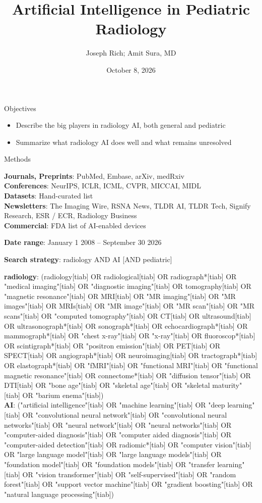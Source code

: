 \documentclass[aspectratio=169]{beamer}
\title[Radiology AI]{Artificial Intelligence in Pediatric Radiology}
\author{Joseph Rich; Amit Sura, MD}
\institute{CHLA Radiology Grand Rounds}
\date{October 8, 2026}
\begin{document}
\frame{\titlepage}

\begin{frame}{Objectives}
\begin{itemize}
  \item Describe the big players in radiology AI, both general and pediatric
  \item Summarize what radiology AI does well and what remains unresolved
\end{itemize}
\end{frame}

\begin{frame}{Methods}
\vspace{-4pt}
{\small
\textbf{Journals, Preprints}: PubMed, Embase, arXiv, medRxiv\\
\textbf{Conferences}: NeurIPS, ICLR, ICML, CVPR, MICCAI, MIDL\\
\textbf{Datasets}: Hand-curated list\\
\textbf{Newsletters}: The Imaging Wire, RSNA News, TLDR AI, TLDR Tech, Signify Research, ESR / ECR, Radiology Business\\
\textbf{Commercial}: FDA list of AI-enabled devices\par}
\vspace{2pt}
{\small\textbf{Date range}: January 1 2008 -- September 30 2026\par}
{\small\textbf{Search strategy}: radiology AND AI [AND pediatric]\par}
\vspace{2pt}
{\tiny\fontsize{6}{7.3}\selectfont\raggedright
\textbf{radiology}: (radiology[tiab] OR radiological[tiab] OR radiograph*[tiab] OR "medical imaging"[tiab] OR "diagnostic imaging"[tiab] OR tomography[tiab] OR "magnetic resonance"[tiab] OR MRI[tiab] OR "MR imaging"[tiab] OR "MR images"[tiab] OR MRIs[tiab] OR "MR image"[tiab] OR "MR scan"[tiab] OR "MR scans"[tiab] OR "computed tomography"[tiab] OR CT[tiab] OR ultrasound[tiab] OR ultrasonograph*[tiab] OR sonograph*[tiab] OR echocardiograph*[tiab] OR mammograph*[tiab] OR "chest x-ray"[tiab] OR "x-ray"[tiab] OR fluoroscop*[tiab] OR scintigraph*[tiab] OR "positron emission"[tiab] OR PET[tiab] OR SPECT[tiab] OR angiograph*[tiab] OR neuroimaging[tiab] OR tractograph*[tiab] OR elastograph*[tiab] OR "fMRI"[tiab] OR "functional MRI"[tiab] OR "functional magnetic resonance"[tiab] OR connectome*[tiab] OR "diffusion tensor"[tiab] OR DTI[tiab] OR "bone age"[tiab] OR "skeletal age"[tiab] OR "skeletal maturity"[tiab] OR "barium enema"[tiab])\\[2pt]
\textbf{AI}: ("artificial intelligence"[tiab] OR "machine learning"[tiab] OR "deep learning"[tiab] OR "convolutional neural network"[tiab] OR "convolutional neural networks"[tiab] OR "neural network"[tiab] OR "neural networks"[tiab] OR "computer-aided diagnosis"[tiab] OR "computer aided diagnosis"[tiab] OR "computer-aided detection"[tiab] OR radiomic*[tiab] OR "computer vision"[tiab] OR "large language model"[tiab] OR "large language models"[tiab] OR "foundation model"[tiab] OR "foundation models"[tiab] OR "transfer learning"[tiab] OR "vision transformer"[tiab] OR "self-supervised"[tiab] OR "random forest"[tiab] OR "support vector machine"[tiab] OR "gradient boosting"[tiab] OR "natural language processing"[tiab])\\[2pt]
}
\end{frame}
\end{document}
